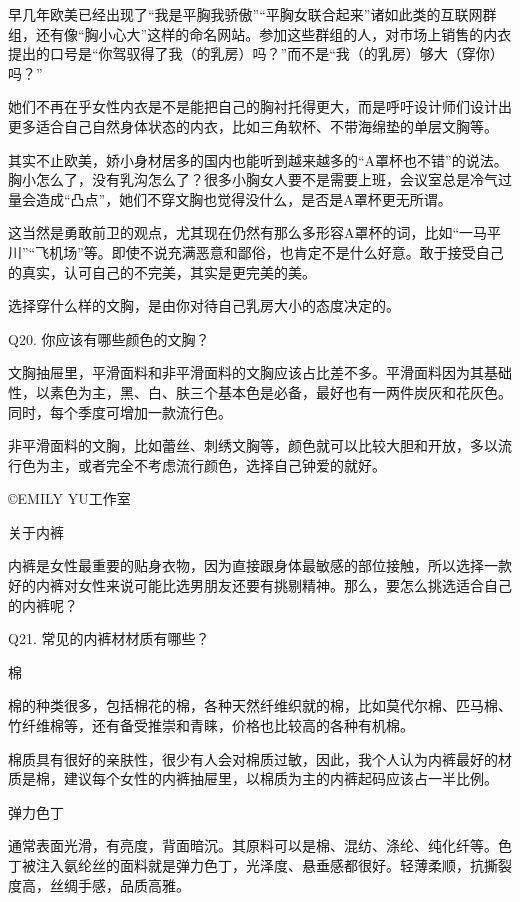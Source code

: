 \documentclass[12pt,UTF8]{ctexbook}
\begin{document}
早几年欧美已经出现了“我是平胸我骄傲”“平胸女联合起来”诸如此类的互联网群组，还有像“胸小心大”这样的命名网站。参加这些群组的人，对市场上销售的内衣提出的口号是“你驾驭得了我（的乳房）吗？”而不是“我（的乳房）够大（穿你）吗？”

她们不再在乎女性内衣是不是能把自己的胸衬托得更大，而是呼吁设计师们设计出更多适合自己自然身体状态的内衣，比如三角软杯、不带海绵垫的单层文胸等。

其实不止欧美，娇小身材居多的国内也能听到越来越多的“A罩杯也不错”的说法。胸小怎么了，没有乳沟怎么了？很多小胸女人要不是需要上班，会议室总是冷气过量会造成“凸点”，她们不穿文胸也觉得没什么，是否是A罩杯更无所谓。

这当然是勇敢前卫的观点，尤其现在仍然有那么多形容A罩杯的词，比如“一马平川”“飞机场”等。即使不说充满恶意和鄙俗，也肯定不是什么好意。敢于接受自己的真实，认可自己的不完美，其实是更完美的美。

选择穿什么样的文胸，是由你对待自己乳房大小的态度决定的。





Q20. 你应该有哪些颜色的文胸？


文胸抽屉里，平滑面料和非平滑面料的文胸应该占比差不多。平滑面料因为其基础性，以素色为主，黑、白、肤三个基本色是必备，最好也有一两件炭灰和花灰色。同时，每个季度可增加一款流行色。

非平滑面料的文胸，比如蕾丝、刺绣文胸等，颜色就可以比较大胆和开放，多以流行色为主，或者完全不考虑流行颜色，选择自己钟爱的就好。

©EMILY YU工作室





关于内裤


内裤是女性最重要的贴身衣物，因为直接跟身体最敏感的部位接触，所以选择一款好的内裤对女性来说可能比选男朋友还要有挑剔精神。那么，要怎么挑选适合自己的内裤呢？





Q21. 常见的内裤材材质有哪些？


棉

棉的种类很多，包括棉花的棉，各种天然纤维织就的棉，比如莫代尔棉、匹马棉、竹纤维棉等，还有备受推崇和青睐，价格也比较高的各种有机棉。

棉质具有很好的亲肤性，很少有人会对棉质过敏，因此，我个人认为内裤最好的材质是棉，建议每个女性的内裤抽屉里，以棉质为主的内裤起码应该占一半比例。

弹力色丁

通常表面光滑，有亮度，背面暗沉。其原料可以是棉、混纺、涤纶、纯化纤等。色丁被注入氨纶丝的面料就是弹力色丁，光泽度、悬垂感都很好。轻薄柔顺，抗撕裂度高，丝绸手感，品质高雅。
\end{document}
